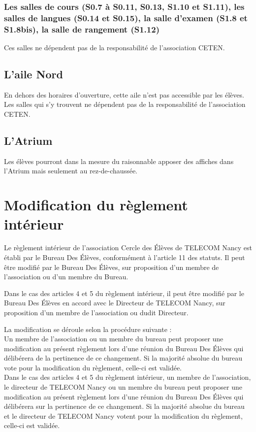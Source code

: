 \documentclass{article} %
\begin{document}
			\subsubsection{Les salles de cours (S0.7 à S0.11, S0.13, S1.10 et
			S1.11), les salles de langues (S0.14 et S0.15), la salle d’examen
			(S1.8 et S1.8bis), la salle de rangement (S1.12)}

				Ces salles ne dépendent pas de la responsabilité de
				l'association CETEN.

		\subsection{L’aile Nord}

			En dehors des horaires d’ouverture, cette aile n’est pas accessible
			par les élèves. Les salles qui s’y trouvent ne dépendent pas de la
			responsabilité de l'association CETEN.

		\subsection{L’Atrium}

			Les élèves pourront dans la mesure du raisonnable apposer des
			affiches dans l’Atrium mais seulement au rez-de-chaussée.

	\section{Modification du règlement intérieur}

		Le règlement intérieur de l’association Cercle des Élèves de TELECOM
		Nancy est établi par le Bureau Des Élèves, conformément à l'article 11
		des statuts. Il peut être modifié par le Bureau Des Élèves, sur
		proposition d’un membre de l’association ou d’un membre du Bureau.

		Dans le cas des articles 4 et 5 du règlement intérieur, il peut être
		modifié par le Bureau Des Élèves en accord avec le Directeur de TELECOM
		Nancy, sur proposition d’un membre de l’association ou dudit Directeur.

		La modification se déroule selon la procédure suivante : \\
		Un membre de l’association ou un membre du bureau peut proposer une
		modification au présent règlement lors d’une réunion du Bureau Des
		Élèves qui délibérera de la pertinence de ce changement. Si la majorité
		absolue du bureau vote pour la modification du règlement, celle-ci est
		validée. \\
		Dans le cas des articles 4 et 5 du règlement intérieur, un membre de
		l’association, le directeur de TELECOM Nancy ou un membre du bureau
		peut proposer une modification au présent règlement lors d’une réunion
		du Bureau Des Élèves qui délibérera sur la pertinence de ce changement.
		Si la majorité absolue du bureau et le directeur de TELECOM Nancy
		votent pour la modification du règlement, celle-ci est validée. 
\end{document}
